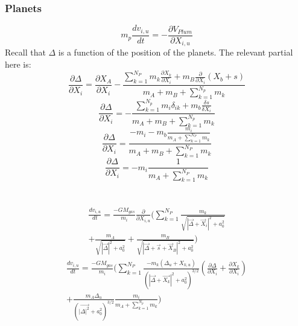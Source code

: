 \documentclass{aastex631}
\begin{document}
\subsubsection{Planets}
\begin{equation}
    m_p\frac{dv_{i,u}}{dt} = -\frac{\partial V_{Plum}}{\partial X_{i,u}}
\end{equation}
Recall that $\Delta$ is a function of the position of the planets. The relevant partial here is:
\begin{equation}
\frac{\partial \Delta}{\partial X_i} = \frac{\partial X_A}{\partial X_i} - 
\frac{\sum_{k=1}^{N_P}m_k\frac{\partial X_k}{\partial X_i}+m_B\frac{\partial}{\partial X_i}(X_b+s)}{m_A+m_B+\sum_{k=1}^{N_p}m_k}
\end{equation}
\begin{equation}
   \frac{\partial \Delta}{\partial X_i} = 
   -\frac{\sum_{k=1}^{N_p}m_i\delta_{ik}+m_b\frac{\delta s}{\delta X_i}}{m_A+m_B+\sum_{k=1}^{N_p}m_k} 
\end{equation}
\begin{equation}
\frac{\partial \Delta}{\partial X_i} = 
\frac{-m_i-m_b\frac{m_i}{m_A+\sum_{k=1}^{N_P}m_k}}{m_A+m_B +\sum_{k=1}^{N_P}m_k}
\end{equation}
\begin{equation}
    \frac{\partial \Delta}{\partial X_i} = -m_i\frac{1}{m_A+\sum_{k=1}^{N_P}m_k}
\end{equation}
\\ \\
\begin{equation}
\begin{split}
    \frac{dv_{i,u}}{dt} = 
    \frac{-GM_{gas}}{m_i}\frac{\partial}{\partial X_{i,u}}\biggl(\sum_{k=1}^{N_P}\frac{m_k}{\sqrt{|\vec{\Delta}+\vec{X}_i|^2+a_0^2}}\\
    +\frac{m_A}{\sqrt{|\vec{\Delta}|^2+a_0^2}}+\frac{m_B}{\sqrt{|\vec{\Delta}+\vec{s}+\vec{X}_B|^2+a^2_0}} \biggr )
\end{split}
\end{equation}
\begin{equation}
    \begin{split}
    \frac{dv_{i,u}}{dt} = 
    \frac{-GM_{gas}}{m_i}\biggl(\sum_{k=1}^{N_P}\frac{-m_k(\Delta_u+X_{k,u})}{(|\vec{\Delta}+\vec{X_k}|^2+a_0^2)^{3/2}}(\frac{\partial \Delta}{\partial X_i}+
    \frac{\partial X_k}{\partial X_i})\\+\frac{m_A\Delta_u}{(|\vec{\Delta|^2}+a_0^2)^{3/2}}\frac{m_i}{m_A+\sum_{k=1}^{N_p}m_k} \biggr)    
    \end{split}
\end{equation}
\end{document}

